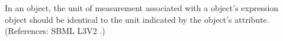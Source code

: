 In an \Event object, the unit of measurement associated with a \Delay
object's  expression object should be identical to the unit
indicated by the \Model object's  attribute.  (References:
SBML L3V2 .)
